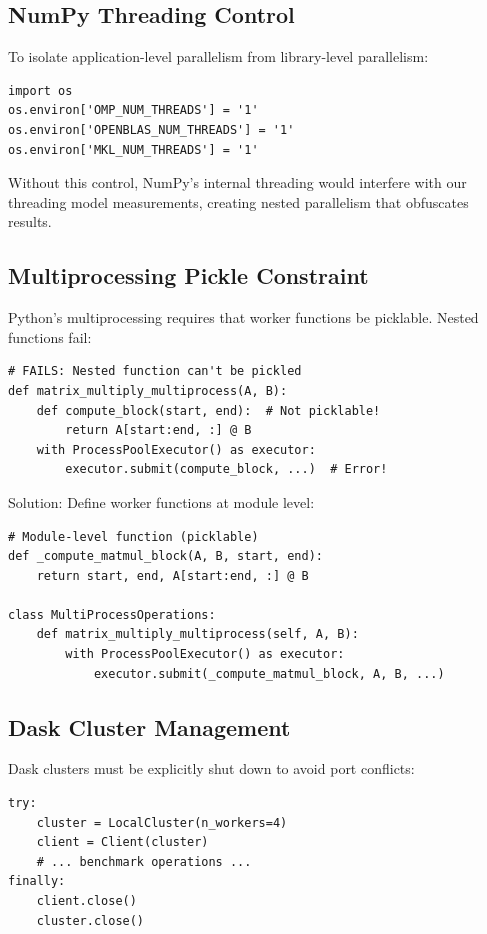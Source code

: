 \subsection{NumPy Threading Control}

To isolate application-level parallelism from library-level parallelism:

\begin{verbatim}
import os
os.environ['OMP_NUM_THREADS'] = '1'
os.environ['OPENBLAS_NUM_THREADS'] = '1'
os.environ['MKL_NUM_THREADS'] = '1'
\end{verbatim}

Without this control, NumPy's internal threading would interfere with our threading model measurements, creating nested parallelism that obfuscates results.

\subsection{Multiprocessing Pickle Constraint}

Python's multiprocessing requires that worker functions be picklable. Nested functions fail:

\begin{verbatim}
# FAILS: Nested function can't be pickled
def matrix_multiply_multiprocess(A, B):
    def compute_block(start, end):  # Not picklable!
        return A[start:end, :] @ B
    with ProcessPoolExecutor() as executor:
        executor.submit(compute_block, ...)  # Error!
\end{verbatim}

Solution: Define worker functions at module level:

\begin{verbatim}
# Module-level function (picklable)
def _compute_matmul_block(A, B, start, end):
    return start, end, A[start:end, :] @ B

class MultiProcessOperations:
    def matrix_multiply_multiprocess(self, A, B):
        with ProcessPoolExecutor() as executor:
            executor.submit(_compute_matmul_block, A, B, ...)
\end{verbatim}

\subsection{Dask Cluster Management}

Dask clusters must be explicitly shut down to avoid port conflicts:

\begin{verbatim}
try:
    cluster = LocalCluster(n_workers=4)
    client = Client(cluster)
    # ... benchmark operations ...
finally:
    client.close()
    cluster.close()
\end{verbatim}

